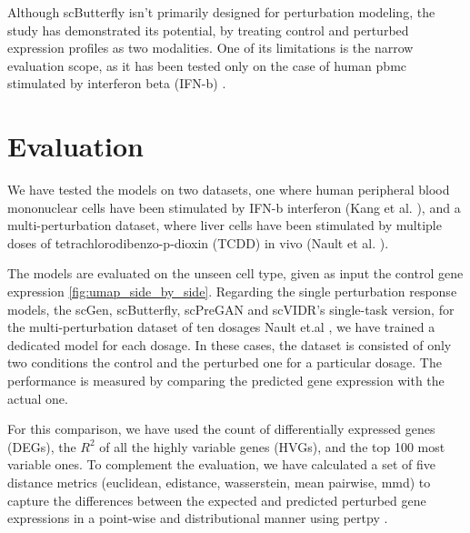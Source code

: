 \documentclass[12pt, a4paper]{article}
\begin{document}
Although scButterfly isn't primarily designed for perturbation modeling, the study has demonstrated its potential, by treating control and perturbed expression profiles as two modalities. One of its limitations is the narrow evaluation scope, as it has been tested only on the case of human \gls{pbmc} stimulated by interferon beta (IFN-b) \cite{kanaGenerativeModelingSinglecell2023}.

\clearpage


\section{Evaluation}



We have tested the models on two datasets, one where human peripheral blood mononuclear cells have been stimulated by IFN-b interferon (Kang et al. \cite{kanaGenerativeModelingSinglecell2023}), and a multi-perturbation dataset, where liver cells have been stimulated by multiple doses of tetrachlorodibenzo-p-dioxin (TCDD) in vivo (Nault et al. \cite{nault2021single,nault2022benchmarking}).

The models are evaluated on the unseen cell type, given as input the control gene expression \cref{fig:umap_side_by_side}.
Regarding the single perturbation response models, the scGen, scButterfly, scPreGAN and scVIDR's single-task version, for the multi-perturbation dataset of ten dosages Nault et.al \cite{nault2021single,nault2022benchmarking}, we have trained a dedicated model for each dosage. In these cases, the dataset is consisted of only two conditions the control and the perturbed one for a particular dosage. The performance is measured by comparing the predicted gene expression with the actual one.

For this comparison, we have used the count of differentially expressed genes (DEGs), the $R^2$ of all the highly variable genes (HVGs), and the top 100 most variable ones. To complement the evaluation, we have calculated a set of five distance metrics (euclidean, edistance, wasserstein, mean pairwise, mmd) to capture the differences between the expected and predicted perturbed gene expressions in a point-wise and distributional manner using pertpy \cite{heumos2024pertpy}.
\end{document}
